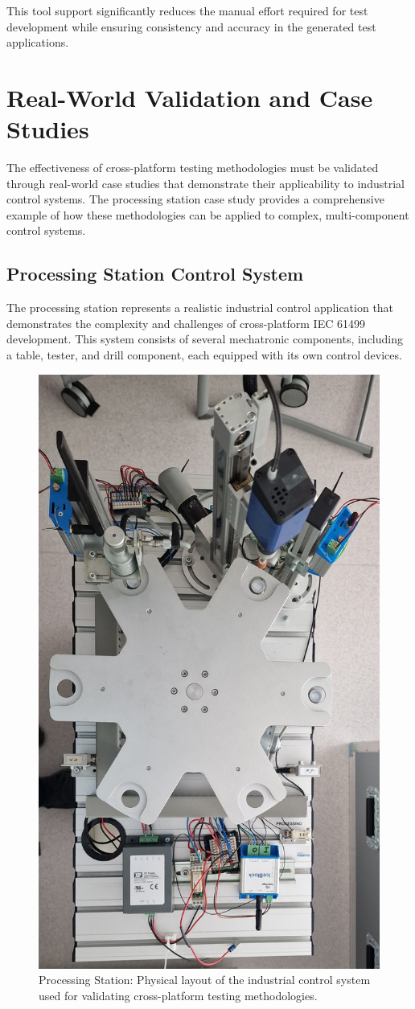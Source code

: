 This tool support significantly reduces the manual effort required for test development while ensuring consistency and accuracy in the generated test applications.

\section{Real-World Validation and Case Studies}

The effectiveness of cross-platform testing methodologies must be validated through real-world case studies that demonstrate their applicability to industrial control systems. The processing station case study provides a comprehensive example of how these methodologies can be applied to complex, multi-component control systems.

\subsection{Processing Station Control System}

The processing station represents a realistic industrial control application that demonstrates the complexity and challenges of cross-platform IEC 61499 development. This system consists of several mechatronic components, including a table, tester, and drill component, each equipped with its own control devices.

\begin{figure}[!htbp]
    \centering
    \includegraphics[width=0.5\linewidth]{MX_Papers/Paper10/Figures/processingStation.jpg}
    \caption{Processing Station: Physical layout of the industrial control system used for validating cross-platform testing methodologies.}
    \label{fig:processing_station}
\end{figure}


